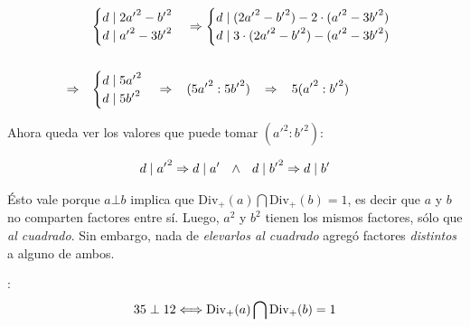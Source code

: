 \documentclass{article}
\newcommand{\nln}{\par\vspace{3mm}}
\newcommand{\myuline}[1]{%
  \uline{\phantom{#1}}%
  \llap{\contour{white}{#1}}%
}
\begin{document}
\begin{align*}
     &\begin{cases}
       d \mid 2 {a'}^2 - {b'}^2 \\ 
       d \mid {a'}^2 - 3{b'}^2
     \end{cases}
     \Rightarrow
     \begin{cases}
       d \mid (2 {a'}^2 - {b'}^2) - 2 \cdot ({a'}^2 - 3{b'}^2) \\ 
       d \mid 3 \cdot (2{a'}^2 - {b'}^2) - ({a'}^2 - 3{b'}^2)
     \end{cases}
     \\ \\
     \Rightarrow
     \hspace{3mm}&\begin{cases}
       d \mid 5{a'}^2 \\ 
       d \mid 5{b'}^2
     \end{cases}
     \Rightarrow \hspace{3mm}
     (5{a'}^2 : 5{b'}^2) \hspace{3mm}
     \Rightarrow \hspace{3mm} 5 ({a'}^2 : {b'}^2)
\end{align*}

Ahora queda ver los valores que puede tomar $({a'}^2:{b'}^2)$:

\begin{align*}
    d \mid {a'}^2 \Rightarrow d \mid a' \hspace{2.5mm} \land \hspace{2.5mm} d \mid {b'}^2 \Rightarrow d \mid b'
\end{align*}


Ésto vale porque $a \bot b$ implica que $\text{Div}_{+}(a) \bigcap \text{Div}_{+}(b) = 1$, es decir que
$a$ y $b$ no comparten factores entre sí. Luego, $a^2$ y $b^2$ tienen los mismos factores, sólo que \textit{al cuadrado}. 
Sin embargo, nada de \textit{elevarlos al cuadrado} agregó factores \textit{distintos} a alguno de ambos.
\nln
\textit{\myuline{Ejemplo}}:
\begin{align*}
    35 \hspace{1mm} \bot \hspace{1mm} 12 \Longleftrightarrow \text{Div}_{+}(a) \bigcap \text{Div}_{+}(b) = 1
\end{align*}
\end{document}
